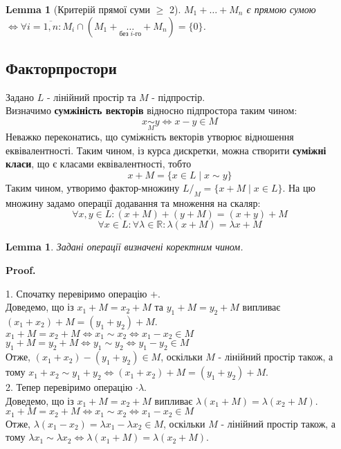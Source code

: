 \documentclass[a4paper, 10pt]{article}
\makeatletter
\theoremstyle{theoremdd}
\newtheorem{lemma}[theorem]{Lemma}
\renewenvironment{proof}[1][Proof.\\]{\par
\pushQED{\hfill \qed}%
\normalfont \topsep6\p@\@plus6\p@\relax
\trivlist
\item\relax
{\bfseries
#1\@addpunct{.}}\hspace\labelsep\ignorespaces
}{%
\popQED\endtrivlist\@endpefalse
}
\makeatother
\begin{document}
	\begin{lemma}[Критерій прямої суми $\geq$ 2]
	$M_1 + \dots + M_n$ є прямою сумою $\iff \forall i = \overline{1,n}: M_i \cap (M_1 + \underset{\text{без } i \text{-го}}{\dots} + M_n ) = \{0\}$.
	\end{lemma}
	
	\subsection{Факторпростори}
	Задано $L$ - лінійний простір та $M$ - підпростір.\\
	Визначимо \textbf{сумжіність векторів} відносно підпростора таким чином:
	$$ x \underset{M}{\sim} y \iff x-y \in M$$
	Неважко переконатись, що суміжність векторів утворює відношення еквівалентності. Таким чином, із курса дискретки, можна створити \textbf{суміжні класи}, що є класами еквівалентності, тобто
	$$ x + M = \{x \in L \mid x \sim y\} $$
	Таким чином, утворимо фактор-множину $L/_{M} = \{x+M \mid x \in L\}$. На цю множину задамо операції додавання та множення на скаляр:
	$$ \forall x,y \in L: (x+M)+(y+M) = (x+y)+M $$
	$$ \forall x \in L: \forall \lambda \in \mathbb{R}: \lambda(x+M) = \lambda x + M$$
	
	\begin{lemma}
	Задані операції визначені коректним чином.
	\end{lemma}
	
	\begin{proof}
	1. Спочатку перевіримо операцію $+$.\\
	Доведемо, що із $x_1+M=x_2+M$ та $y_1+M=y_2+M$ випливає $(x_1+x_2)+M=(y_1+y_2)+M$.\\
	$x_1+M=x_2+M \iff x_1 \sim x_2 \iff x_1 - x_2 \in M$\\
	$y_1+M=y_2+M \iff y_1 \sim y_2 \iff y_1 - y_2 \in M$\\
	Отже, $(x_1+x_2)-(y_1+y_2) \in M$, оскільки $M$ - лінійний простір також, а тому $x_1+x_2 \sim y_1+y_2 \iff (x_1+x_2)+M=(y_1+y_2)+M$.
	\bigskip \\
	2. Тепер перевіримо операцію $\cdot \lambda$.\\
	Доведемо, що із $x_1+M=x_2+M$ випливає $\lambda(x_1+M) = \lambda(x_2+M)$.\\
	$x_1+M=x_2+M \iff x_1 \sim x_2 \iff x_1 - x_2 \in M$\\
	Отже, $\lambda(x_1-x_2) = \lambda x_1 - \lambda x_2 \in M$, оскільки $M$ - лінійний простір також, а тому $\lambda x_1 \sim \lambda x_2 \iff \lambda(x_1+M) = \lambda(x_2+M)$.
	\end{proof}
	
\end{document}
